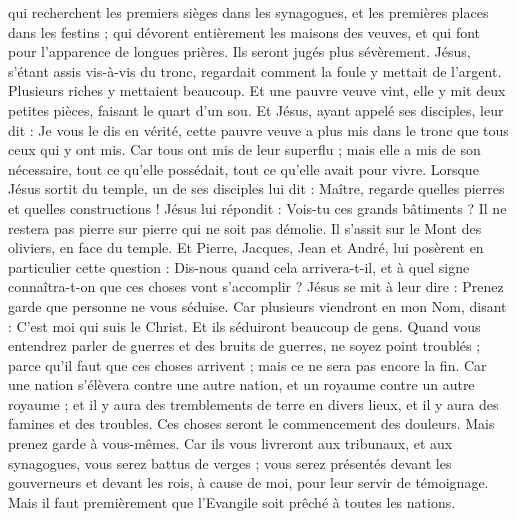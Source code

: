 \begin{multicols}{2}
qui recherchent les premiers sièges dans les synagogues, et les premières places dans les festins ;
qui dévorent entièrement les maisons des veuves, et qui font pour l’apparence de longues prières. Ils seront jugés plus sévèrement.
Jésus, s’étant assis vis-à-vis du tronc, regardait comment la foule y mettait de l'argent. Plusieurs riches y mettaient beaucoup.
Et une pauvre veuve vint, elle y mit deux petites pièces, faisant le quart d’un sou.
Et Jésus, ayant appelé ses disciples, leur dit : Je vous le dis en vérité, cette pauvre veuve a plus mis dans le tronc que tous ceux qui y ont mis.
Car tous ont mis de leur superflu ; mais elle a mis de son nécessaire, tout ce qu'elle possédait, tout ce qu’elle avait pour vivre.
\VerseOne{}Lorsque Jésus sortit du temple, un de ses disciples lui dit : Maître, regarde quelles pierres et quelles constructions !
Jésus lui répondit : Vois-tu ces grands bâtiments ? Il ne restera pas pierre sur pierre qui ne soit pas démolie.
Il s’assit sur le Mont des oliviers, en face du temple. Et Pierre, Jacques, Jean et André, lui posèrent en particulier cette question :
Dis-nous quand cela arrivera-t-il, et à quel signe connaîtra-t-on que ces choses vont s'accomplir ?
Jésus se mit à leur dire : Prenez garde que personne ne vous séduise.
Car plusieurs viendront en mon Nom, disant : C'est moi qui suis le Christ. Et ils séduiront beaucoup de gens.
Quand vous entendrez parler de guerres et des bruits de guerres, ne soyez point troublés ; parce qu'il faut que ces choses arrivent ; mais ce ne sera pas encore la fin.
Car une nation s'élèvera contre une autre nation, et un royaume contre un autre royaume ; et il y aura des tremblements de terre en divers lieux, et il y aura des famines et des troubles. Ces choses seront le commencement des douleurs.
Mais prenez garde à vous-mêmes. Car ils vous livreront aux tribunaux, et aux synagogues, vous serez battus de verges ; vous serez présentés devant les gouverneurs et devant les rois, à cause de moi, pour leur servir de témoignage.
Mais il faut premièrement que l'Evangile soit prêché à toutes les nations.

\end{multicols}
